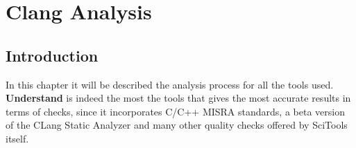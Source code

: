 \chapter{Clang Analysis}

\section{Introduction}

In this chapter it will be described the analysis process for all the tools used.\newline\newline
\textbf{Understand} is indeed the most the tools that gives the most accurate results in terms of checks, since it incorporates C/C++ MISRA standards, a beta version of the CLang Static Analyzer and many other quality checks offered by SciTools itself.\newline
